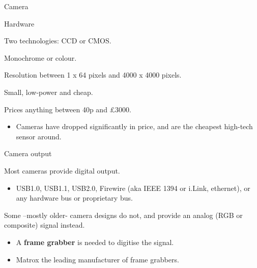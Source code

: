 \documentclass[compress]{beamer}
\providecommand{\tightlist}{%
  \setlength{\itemsep}{0pt}\setlength{\parskip}{0pt}}
\begin{document}
\begin{frame}{Camera}

Hardware

Two technologies: CCD or CMOS.

Monochrome or colour.

Resolution between 1 x 64 pixels and 4000 x 4000 pixels.

Small, low-power and cheap.

Prices anything between 40p and £3000.

\begin{itemize}
\tightlist
\item
  Cameras have dropped significantly in price, and are the cheapest
  high-tech sensor around.
\end{itemize}

\end{frame}

\begin{frame}{Camera output}

Most cameras provide digital output.

\begin{itemize}
\tightlist
\item
  USB1.0, USB1.1, USB2.0, Firewire (aka IEEE 1394 or i.Link, ethernet),
  or any hardware bus or proprietary bus.
\end{itemize}

Some --mostly older- camera designs do not, and provide an analog (RGB
or composite) signal instead.

\begin{itemize}
\tightlist
\item
  A \textbf{frame grabber} is needed to digitise the signal.
\item
  Matrox the leading manufacturer of frame grabbers.
\end{itemize}

\end{frame}
\end{document}
